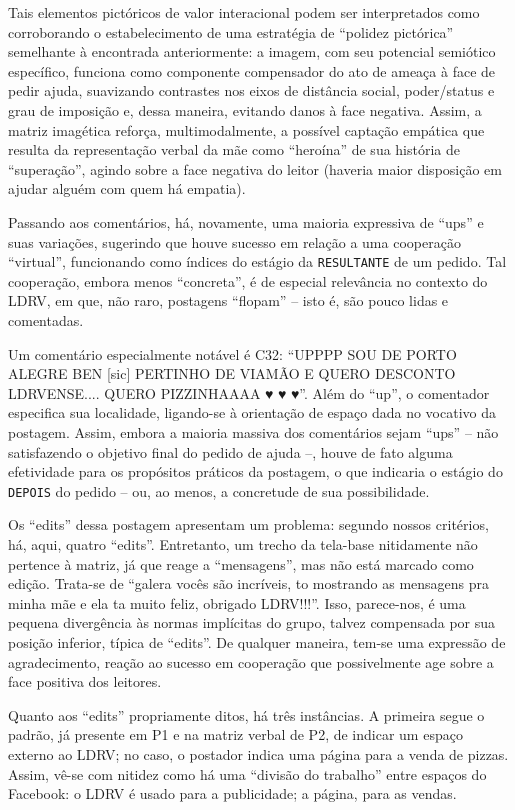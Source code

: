 \documentclass{textolivre}
\begin{document}
Tais elementos pictóricos de valor interacional podem ser interpretados como corroborando o estabelecimento de uma estratégia de “polidez pictórica” semelhante à encontrada anteriormente: a imagem, com seu potencial semiótico específico, funciona como componente compensador do ato de ameaça à face de pedir ajuda, suavizando contrastes nos eixos de distância social, poder/status e grau de imposição e, dessa maneira, evitando danos à face negativa. Assim, a matriz imagética reforça, multimodalmente, a possível captação empática que resulta da representação verbal da mãe como “heroína” de sua história de “superação”, agindo sobre a face negativa do leitor (haveria maior disposição em ajudar alguém com quem há empatia).

Passando aos comentários, há, novamente, uma maioria expressiva de “ups” e suas variações, sugerindo que houve sucesso em relação a uma cooperação “virtual”, funcionando como índices do estágio da \texttt{RESULTANTE} de um pedido. Tal cooperação, embora menos “concreta”, é de especial relevância no contexto do LDRV, em que, não raro, postagens “flopam” – isto é, são pouco lidas e comentadas.

Um comentário especialmente notável é C32: “UPPPP SOU DE PORTO ALEGRE BEN [sic] PERTINHO DE VIAMÃO E QUERO DESCONTO LDRVENSE.... QUERO PIZZINHAAAA {\Symbola ♥ ♥ ♥}”. Além do “up”, o comentador especifica sua localidade, ligando-se à orientação de espaço dada no vocativo da postagem. Assim, embora a maioria massiva dos comentários sejam “ups” – não satisfazendo o objetivo final do pedido de ajuda –, houve de fato alguma efetividade para os propósitos práticos da postagem, o que indicaria o estágio do \texttt{DEPOIS} do pedido – ou, ao menos, a concretude de sua possibilidade.

Os “edits” dessa postagem apresentam um problema: segundo nossos critérios, há, aqui, quatro “edits”. Entretanto, um trecho da tela-base nitidamente não pertence à matriz, já que reage a “mensagens”, mas não está marcado como edição. Trata-se de “galera vocês são incríveis, to mostrando as mensagens pra minha mãe e ela ta muito feliz, obrigado LDRV!!!”. Isso, parece-nos, é uma pequena divergência às normas implícitas do grupo, talvez compensada por sua posição inferior, típica de “edits”. De qualquer maneira, tem-se uma expressão de agradecimento, reação ao sucesso em cooperação que possivelmente age sobre a face positiva dos leitores.

Quanto aos “edits” propriamente ditos, há três instâncias. A primeira segue o padrão, já presente em P1 e na matriz verbal de P2, de indicar um espaço externo ao LDRV; no caso, o postador indica uma página para a venda de pizzas. Assim, vê-se com nitidez como há uma “divisão do trabalho” entre espaços do Facebook: o LDRV é usado para a publicidade; a página, para as vendas.
\end{document}
